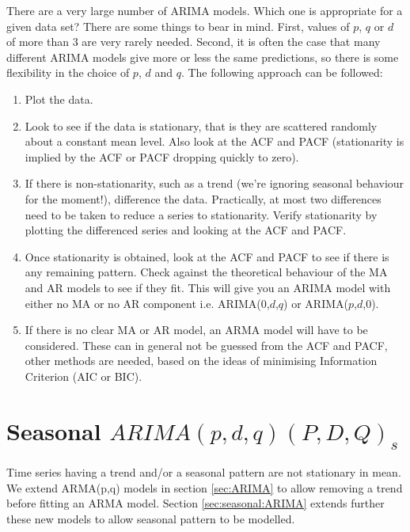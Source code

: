 \documentclass[a4paper,11pt,oneside,onecolumn]{book}
\begin{document}
There are a very large number of ARIMA models. Which one is
appropriate for a given data set? There are some things to bear in
mind. First, values of $p$, $q$ or $d$ of more than 3 are very
rarely needed. Second, it is often the case that many different
ARIMA models give more or less the same predictions, so there is
some flexibility in the choice of $p$, $d$ and $q$.  The following
approach can be followed:

\begin{enumerate}
\item Plot the data.

\item Look to see if the data is stationary, that is they are scattered randomly about a constant mean level.
Also look at the ACF and PACF (stationarity is implied by the ACF or
PACF dropping quickly to zero).
\item If there is non-stationarity, such as a trend (we're ignoring seasonal behaviour for the moment!), difference the data.
Practically, at most two differences need to be taken to reduce a
series to stationarity. Verify stationarity by plotting the
differenced series and looking at the ACF and PACF.
\item Once stationarity is obtained, look at the ACF and PACF to see if there is any remaining pattern.
Check against the theoretical behaviour of the MA and AR models to
see if they fit. This will give you an ARIMA model with either no MA
or no AR component i.e. ARIMA(0,$d$,$q$) or ARIMA($p$,$d$,0).
\item If there is no clear MA or AR model, an ARMA model will have to be considered. These can in general
not be guessed from the ACF and PACF, other methods are needed,
based on the ideas of minimising Information Criterion (AIC or BIC).
\end{enumerate}



\chapter{Seasonal   $ARIMA(p,d,q)(P,D,Q)_s$}
\label{chp:Seasonal:ARIMA}



Time series having a trend and/or a seasonal pattern are not stationary in mean.
We extend ARMA(p,q) models in section \ref{sec:ARIMA} to allow removing a trend before fitting an ARMA model.
Section \ref {sec:seasonal:ARIMA} extends further these new models to allow seasonal pattern to be modelled.
\end{document}
